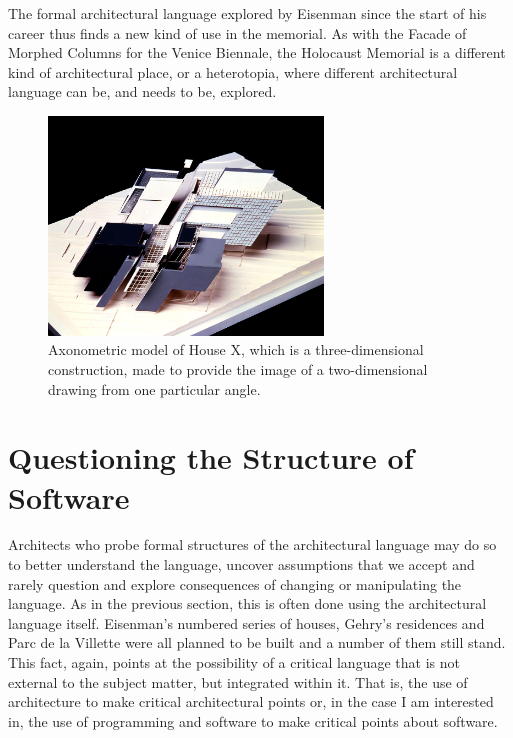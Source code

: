 The formal architectural language explored by Eisenman since the start of his career thus
finds a new kind of use in the memorial. As with the Facade of Morphed Columns for the Venice
Biennale, the Holocaust Memorial is a different kind of architectural place, or a heterotopia,
where different architectural language can be, and needs to be, explored.

%
%

\begin{figure}
\centering
\vspace{-1em}
\includegraphics[width=0.65\textwidth]{fig/axonometric.jpg}\quad
\caption{Axonometric model of House X, which is a three-dimensional construction,
made to provide the image of a two-dimensional drawing from one particular angle.}
\label{fig:axonometric}
\end{figure}

\section{Questioning the Structure of Software}
Architects who probe formal structures of the architectural language may do so to better understand
the language, uncover assumptions that we accept and rarely question and explore consequences of
changing or manipulating the language. As in the previous section, this is often done using the
architectural language itself. Eisenman's numbered series of houses, Gehry's residences and Parc
de la Villette were all planned to be built and a number of them still stand.
This fact, again, points at the possibility of a critical language that is not external to the subject
matter, but integrated within it. That is, the use of architecture to make critical architectural points
or, in the case I am interested in, the use of programming and software to make critical points about
software.

